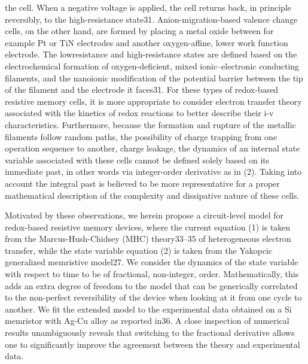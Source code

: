 \documentclass[10pt]{article}
\begin{document}
\begin{multicols}{2}
the cell. When a negative voltage is applied, the cell returns back, in principle reversibly, to the high-resistance state31. Anion-migration-based valence change cells, on
the other hand, are formed by placing a metal oxide
between for example Pt or TiN electrodes and another
oxygen-affine, lower work function electrode. The lowresistance and high-resistance states are defined based on
the electrochemical formation of oxygen-deficient, mixed
ionic–electronic conducting filaments, and the nanoionic
modification of the potential barrier between the tip of
the filament and the electrode it faces31. For these types
of redox-based resistive memory cells, it is more appropriate to consider electron transfer theory associated with
the kinetics of redox reactions to better describe their i-v
characteristics. Furthermore, because the formation and
rupture of the metallic filaments follow random paths,
the possibility of charge trapping from one operation sequence to another, charge leakage, the dynamics of an
internal state variable associated with these cells cannot
be defined solely based on its immediate past, in other
words via integer-order derivative as in (2). Taking into
account the integral past is believed to be more representative for a proper mathematical description of the
complexity and dissipative nature of these cells.
\par 
Motivated by these observations, we herein propose
a circuit-level model for redox-based resistive memory
devices, where the current equation (1) is taken from
the Marcus-Hush-Chidsey (MHC) theory33–35 of heterogeneous electron transfer, while the state variable equation (2) is taken from the Yakopcic generalized memristive model27. We consider the dynamics of the state variable with respect to time to be of fractional, non-integer,
order. Mathematically, this adds an extra degree of freedom to the model that can be generically correlated to
the non-perfect reversibility of the device when looking
at it from one cycle to another. We fit the extended
model to the experimental data obtained on a Si memristor with Ag-Cu alloy as reported in36. A close inspection
of numerical results unambiguously reveals that switching to the fractional derivative allows one to significantly
improve the agreement between the theory and experimental data.
{\centering %
}
\end{multicols}
\end{document}
